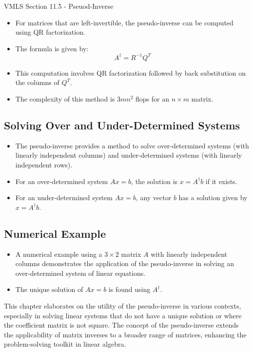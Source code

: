 \begin{notes}{VMLS Section 11.5 - Pseuod-Inverse}
    \begin{Highlight}
        \begin{itemize}
            \item For matrices that are left-invertible, the pseudo-inverse can be computed using QR factorization.
            \item The formula is given by:
            \begin{equation*}
                A^\dagger = R^{-1}Q^T
            \end{equation*}
            \item This computation involves QR factorization followed by back substitution on the columns of $Q^T$.
            \item The complexity of this method is $3mn^2$ flops for an $n \times m$ matrix.
        \end{itemize}
    \end{Highlight}
    
    \subsection*{Solving Over and Under-Determined Systems}
    \begin{itemize}
        \item The pseudo-inverse provides a method to solve over-determined systems (with linearly independent columns) and under-determined systems (with linearly independent rows).
        \item For an over-determined system $Ax = b$, the solution is $x = A^\dagger b$ if it exists.
        \item For an under-determined system $Ax = b$, any vector $b$ has a solution given by $x = A^\dagger b$.
    \end{itemize}
    
    \subsection*{Numerical Example}
    \begin{itemize}
        \item A numerical example using a $3 \times 2$ matrix $A$ with linearly independent columns demonstrates the application of the pseudo-inverse in solving an over-determined system of linear equations.
        \item The unique solution of $Ax = b$ is found using $A^\dagger$.
    \end{itemize}
    
    This chapter elaborates on the utility of the pseudo-inverse in various contexts, especially in solving linear systems that do not have a unique solution or where the coefficient matrix is not 
    square. The concept of the pseudo-inverse extends the applicability of matrix inverses to a broader range of matrices, enhancing the problem-solving toolkit in linear algebra.
\end{notes}